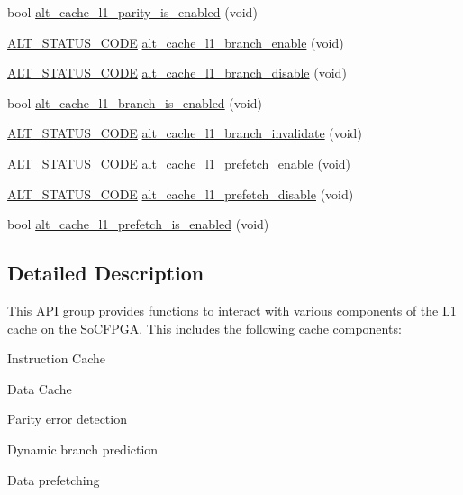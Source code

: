 \begin{DoxyCompactItemize}
bool \mbox{\hyperlink{group__CACHE__L1_gac40b8b1929d205fcaf4b213db7c80454}{alt\+\_\+cache\+\_\+l1\+\_\+parity\+\_\+is\+\_\+enabled}} (void)
\item 
\mbox{\hyperlink{hwlib_8h_abdb0d369f069723ca55d6c94bcaaaa12}{A\+L\+T\+\_\+\+S\+T\+A\+T\+U\+S\+\_\+\+C\+O\+DE}} \mbox{\hyperlink{group__CACHE__L1_ga4fc796e78302b0717838a92a0a922678}{alt\+\_\+cache\+\_\+l1\+\_\+branch\+\_\+enable}} (void)
\item 
\mbox{\hyperlink{hwlib_8h_abdb0d369f069723ca55d6c94bcaaaa12}{A\+L\+T\+\_\+\+S\+T\+A\+T\+U\+S\+\_\+\+C\+O\+DE}} \mbox{\hyperlink{group__CACHE__L1_gaf1dad3fa0be0a3b73b6d1b1709c6c968}{alt\+\_\+cache\+\_\+l1\+\_\+branch\+\_\+disable}} (void)
\item 
bool \mbox{\hyperlink{group__CACHE__L1_ga832720675bd1ff338b73479cf94b244c}{alt\+\_\+cache\+\_\+l1\+\_\+branch\+\_\+is\+\_\+enabled}} (void)
\item 
\mbox{\hyperlink{hwlib_8h_abdb0d369f069723ca55d6c94bcaaaa12}{A\+L\+T\+\_\+\+S\+T\+A\+T\+U\+S\+\_\+\+C\+O\+DE}} \mbox{\hyperlink{group__CACHE__L1_gaad63482f604077274c24e6210885dc83}{alt\+\_\+cache\+\_\+l1\+\_\+branch\+\_\+invalidate}} (void)
\item 
\mbox{\hyperlink{hwlib_8h_abdb0d369f069723ca55d6c94bcaaaa12}{A\+L\+T\+\_\+\+S\+T\+A\+T\+U\+S\+\_\+\+C\+O\+DE}} \mbox{\hyperlink{group__CACHE__L1_ga796ec973ccc04f01e496485fed4aa59b}{alt\+\_\+cache\+\_\+l1\+\_\+prefetch\+\_\+enable}} (void)
\item 
\mbox{\hyperlink{hwlib_8h_abdb0d369f069723ca55d6c94bcaaaa12}{A\+L\+T\+\_\+\+S\+T\+A\+T\+U\+S\+\_\+\+C\+O\+DE}} \mbox{\hyperlink{group__CACHE__L1_ga00810e67920610f7da017ff65a5c9c2c}{alt\+\_\+cache\+\_\+l1\+\_\+prefetch\+\_\+disable}} (void)
\item 
bool \mbox{\hyperlink{group__CACHE__L1_ga315c6618b5e9d4f6505ac9836db83d44}{alt\+\_\+cache\+\_\+l1\+\_\+prefetch\+\_\+is\+\_\+enabled}} (void)
\end{DoxyCompactItemize}


\subsection{Detailed Description}
This A\+PI group provides functions to interact with various components of the L1 cache on the So\+C\+F\+P\+GA. This includes the following cache components\+:
\begin{DoxyItemize}
\item Instruction Cache
\item Data Cache
\item Parity error detection
\item Dynamic branch prediction
\item Data prefetching
\end{DoxyItemize}

